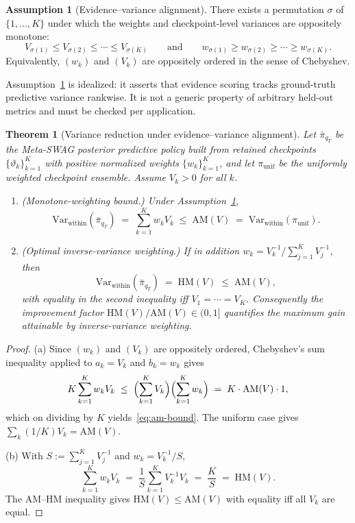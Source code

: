 \documentclass[10pt]{article}
\theoremstyle{plain}
\newtheorem{theorem}{Theorem}
\theoremstyle{definition}
\newtheorem{assumption}{Assumption}
\theoremstyle{remark}
\newcommand{\Var}{\mathrm{Var}}
\newcommand{\HM}{\mathrm{HM}}
\newcommand{\AM}{\mathrm{AM}}
\begin{document}
\begin{assumption}[Evidence--variance alignment]\label{as:evar}
There exists a permutation $\sigma$ of $\{1,\dots,K\}$ under which the weights and checkpoint-level variances are oppositely monotone:
\[
V_{\sigma(1)} \le V_{\sigma(2)} \le \cdots \le V_{\sigma(K)}
\qquad\text{and}\qquad
w_{\sigma(1)} \ge w_{\sigma(2)} \ge \cdots \ge w_{\sigma(K)}.
\]
Equivalently, $(w_k)$ and $(V_k)$ are oppositely ordered in the sense of Chebyshev.
\end{assumption}

Assumption~\ref{as:evar} is idealized: it asserts that evidence scoring tracks ground-truth predictive variance rankwise. It is not a generic property of arbitrary held-out metrics and must be checked per application.

\begin{theorem}[Variance reduction under evidence--variance alignment]\label{thm:var}
Let $\bar{\pi}_{q_T}$ be the Meta-SWAG posterior predictive policy built from retained checkpoints $\{\vartheta_k\}_{k=1}^K$ with positive normalized weights $\{w_k\}_{k=1}^K$, and let $\pi_{\mathrm{unif}}$ be the uniformly weighted checkpoint ensemble. Assume $V_k > 0$ for all $k$.
\begin{enumerate}[leftmargin=1.8em,itemsep=0.2em,label=\textup{(\alph*)}]
  \item \textup{(Monotone-weighting bound.)} Under Assumption~\ref{as:evar},
  \begin{equation}\label{eq:am-bound}
  \Var_{\mathrm{within}}(\bar{\pi}_{q_T})
  \;=\; \sum_{k=1}^K w_k V_k
  \;\le\; \AM(V)
  \;=\; \Var_{\mathrm{within}}(\pi_{\mathrm{unif}}).
  \end{equation}
  \item \textup{(Optimal inverse-variance weighting.)} If in addition $w_k = V_k^{-1}/\sum_{j=1}^K V_j^{-1}$, then
  \begin{equation}\label{eq:hm-bound}
  \Var_{\mathrm{within}}(\bar{\pi}_{q_T}) \;=\; \HM(V) \;\le\; \AM(V),
  \end{equation}
  with equality in the second inequality iff $V_1 = \cdots = V_K$. Consequently the improvement factor $\HM(V)/\AM(V) \in (0,1]$ quantifies the maximum gain attainable by inverse-variance weighting.
\end{enumerate}
\end{theorem}

\begin{proof}
(a) Since $(w_k)$ and $(V_k)$ are oppositely ordered, Chebyshev's sum inequality \citep[\S2.17]{HardyLittlewoodPolya1952} applied to $a_k = V_k$ and $b_k = w_k$ gives
\[
K\sum_{k=1}^K w_k V_k \;\le\; \Bigl(\sum_{k=1}^K V_k\Bigr)\Bigl(\sum_{k=1}^K w_k\Bigr)
\;=\; K\cdot\AM(V)\cdot 1,
\]
which on dividing by $K$ yields~\eqref{eq:am-bound}. The uniform case gives $\sum_k (1/K) V_k = \AM(V)$.

(b) With $S := \sum_{j=1}^K V_j^{-1}$ and $w_k = V_k^{-1}/S$,
\[
\sum_{k=1}^K w_k V_k \;=\; \frac{1}{S}\sum_{k=1}^K V_k^{-1} V_k \;=\; \frac{K}{S} \;=\; \HM(V).
\]
The AM--HM inequality \citep[\S2.5]{HardyLittlewoodPolya1952} gives $\HM(V)\le\AM(V)$ with equality iff all $V_k$ are equal.
\end{proof}
\end{document}
